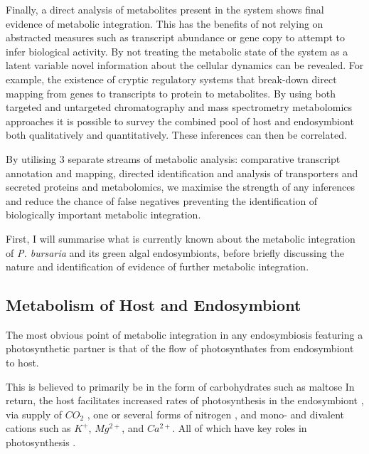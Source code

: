 %

Finally, a direct analysis of metabolites present in the system shows
final evidence of metabolic integration.
This has the benefits of not relying on abstracted measures such as transcript abundance or gene
copy to attempt to infer biological activity. 
By not treating the metabolic
state of the system as a latent variable novel information about the cellular
dynamics can be revealed.   For example, the existence of cryptic regulatory
systems that break-down direct mapping from genes to transcripts to protein to 
metabolites. By using both targeted and untargeted chromatography and mass
spectrometry metabolomics approaches it is possible to survey the combined
pool of host and endosymbiont both qualitatively and quantitatively. 
These inferences can then be correlated.

By utilising 3 separate streams of metabolic analysis: comparative transcript annotation
and mapping, directed identification and analysis of transporters and secreted
proteins and metabolomics, we maximise the strength of any inferences and 
reduce the chance of false negatives preventing the identification of biologically
important metabolic integration.

First, I will summarise what is currently known about the metabolic
integration of \textit{P. bursaria} and its green algal endosymbionts, before
briefly discussing the nature and identification of evidence of further metabolic
integration.

\subsection{Metabolism of Host and Endosymbiont}

The most obvious point of metabolic integration in any endosymbiosis
featuring a photosynthetic partner is that of the flow of photosynthates
from endosymbiont to host.

This is believed to primarily be in the form of carbohydrates such as maltose \citep{Muscatine1967}
In return, the host facilitates increased rates of photosynthesis in the endosymbiont \citep{Sommaruga2009},
via supply of \(CO_{2}\) \citep{Parker1926}, one or several forms of nitrogen \citep{Johnson2011},
and mono- and divalent cations such as \(K^{+}\), \(Mg^{2+}\), and \(Ca^{2+}\). 
All of which have key roles in photosynthesis \citep{Kato2009a}.

